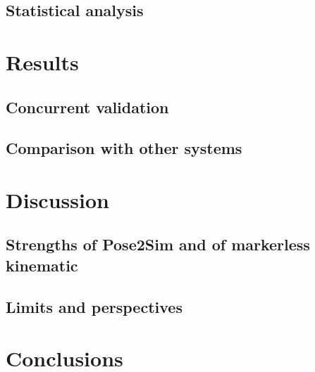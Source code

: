 \subsection{Statistical analysis}
\blindtext


\section{Results}
\subsection{Concurrent validation}
\blindtext

\subsection{Comparison with other systems}
\blindtext


\section{Discussion}
\subsection{Strengths of Pose2Sim and of markerless kinematic}
\blindtext

\subsection{Limits and perspectives}
\blindtext


\section{Conclusions}
\blindtext